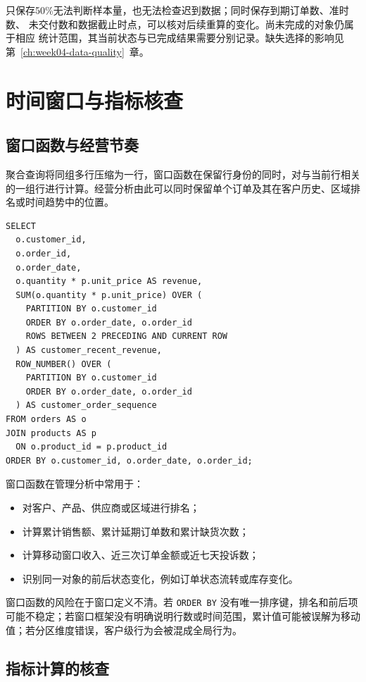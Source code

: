 只保存50\%无法判断样本量，也无法检查迟到数据；同时保存到期订单数、准时数、
未交付数和数据截止时点，可以核对后续重算的变化。尚未完成的对象仍属于相应
统计范围，其当前状态与已完成结果需要分别记录。缺失选择的影响见
第~\ref{ch:week04-data-quality}~章。

\section{时间窗口与指标核查}
\subsection{窗口函数与经营节奏}

聚合查询将同组多行压缩为一行，窗口函数在保留行身份的同时，对与当前行相关的一组行进行计算。经营分析由此可以同时保留单个订单及其在客户历史、区域排名或时间趋势中的位置。

\begin{lstlisting}[style=sqlstyle,caption={客户最近三笔订单收入}]
SELECT
  o.customer_id,
  o.order_id,
  o.order_date,
  o.quantity * p.unit_price AS revenue,
  SUM(o.quantity * p.unit_price) OVER (
    PARTITION BY o.customer_id
    ORDER BY o.order_date, o.order_id
    ROWS BETWEEN 2 PRECEDING AND CURRENT ROW
  ) AS customer_recent_revenue,
  ROW_NUMBER() OVER (
    PARTITION BY o.customer_id
    ORDER BY o.order_date, o.order_id
  ) AS customer_order_sequence
FROM orders AS o
JOIN products AS p
  ON o.product_id = p.product_id
ORDER BY o.customer_id, o.order_date, o.order_id;
\end{lstlisting}

窗口函数在管理分析中常用于：
\begin{itemize}
  \item 对客户、产品、供应商或区域进行排名；
  \item 计算累计销售额、累计延期订单数和累计缺货次数；
  \item 计算移动窗口收入、近三次订单金额或近七天投诉数；
  \item 识别同一对象的前后状态变化，例如订单状态流转或库存变化。
\end{itemize}

窗口函数的风险在于窗口定义不清。若 \texttt{ORDER BY} 没有唯一排序键，排名和前后项可能不稳定；若窗口框架没有明确说明行数或时间范围，累计值可能被误解为移动值；若分区维度错误，客户级行为会被混成全局行为。

\subsection{指标计算的核查}

